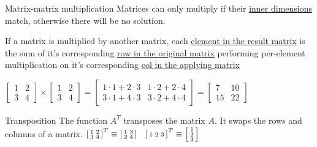 \documentclass{article}
\begin{document}
\begin{knBox}[]{Matrix-matrix multiplication}
    Matrices can only multiply if their \underline{inner dimensions} match, otherwise there will be no solution.

    If a matrix is multiplied by another matrix, each \underline{element in the result matrix} is the sum of it's corresponding \underline{row in the original matrix} performing per-element multiplication on it's corresponding \underline{col in the applying matrix}

    \tcblower
    $\begin{bmatrix}
            1 & 2 \\3 & 4
        \end{bmatrix} \times \begin{bmatrix}
            1 & 2 \\3 & 4
        \end{bmatrix}=\begin{bmatrix}
            1\cdot 1 + 2 \cdot 3 & 1\cdot 2 + 2\cdot 4 \\3\cdot 1 + 4\cdot 3&3\cdot 2 + 4\cdot 4
        \end{bmatrix} = \begin{bmatrix}
            7 & 10 \\15 & 22
        \end{bmatrix}$
\end{knBox}
\begin{knBox}[]{Transposition}
    The function $A^T$ transposes the matrix $A$. It swaps the rows and columns of a matrix.
    \tcblower
    $\begin{bsmallmatrix}
            1&2\\3&4
        \end{bsmallmatrix}^T \equiv \begin{bsmallmatrix}
            1&3\\2&4
        \end{bsmallmatrix}\quad \begin{bsmallmatrix}
            1&2&3
        \end{bsmallmatrix}^T \equiv \begin{bsmallmatrix}
            1\\2\\3
        \end{bsmallmatrix}$
\end{knBox}
\end{document}
